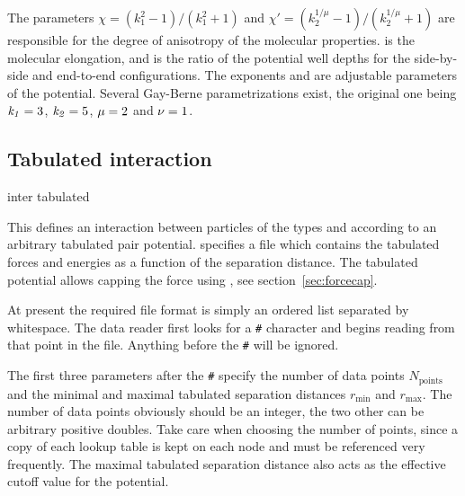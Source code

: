 The parameters $\chi = \left(k_1^{2} - 1\right)/\left(k_1^{2} +
  1\right)$ and $\chi' = \left(k_2^{1/\mu} -
  1\right)/\left(k_2^{1/\mu} + 1\right)$ are responsible for the
degree of anisotropy of the molecular properties.   is the
molecular elongation, and  is the ratio of the potential well
depths for the side-by-side and end-to-end configurations.  The
exponents \var{\mu} and \var{\nu} are adjustable parameters of the
potential.  Several Gay-Berne parametrizations exist, the original one
being $\mathrm{\mathit{k_1}} = 3$, $\mathrm{\mathit{k_2}} = 5$, $\mathrm{\mathit{\mu}} = 2$ and $\mathrm{\mathit{\nu}}
= 1$.

\subsection{Tabulated interaction}
\label{sec:tabnonbonded}

\begin{essyntax}
  inter   tabulated %
  \begin{features}
  \end{features}
\end{essyntax}

This defines an interaction between particles of the types  and
 according to an arbitrary tabulated pair potential. 
specifies a file which contains the tabulated forces and energies as a function
of the separation distance. The tabulated potential allows capping the force
using , see section~\ref{sec:forcecap}.

At present the required file format is simply an ordered list separated by
whitespace. The data reader first looks for a {\tt \#} character and begins
reading from that point in the file. Anything before the {\tt \#} will be
ignored.

The first three parameters after the {\tt \#} specify the number of data points
$N_\mathrm{points}$ and the minimal and maximal tabulated separation distances
$r_\mathrm{min}$ and $r_\mathrm{max}$. The number of data points obviously should
be an integer, the two other can be arbitrary positive doubles. Take care when
choosing the number of points, since a copy of each lookup table is kept on each
node and must be referenced very frequently. The maximal tabulated separation
distance also acts as the effective cutoff value for the potential.

